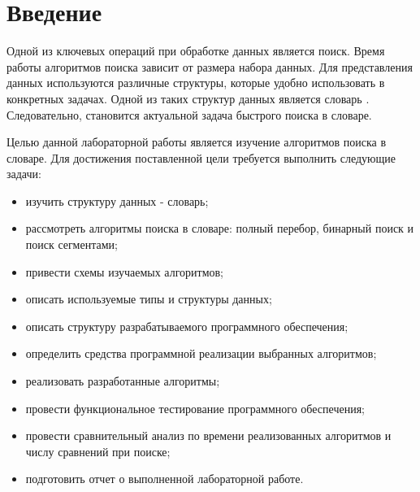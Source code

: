 \chapter*{Введение}

Одной из ключевых операций при обработке данных является поиск. Время работы алгоритмов поиска зависит от размера набора данных. Для представления данных используются различные структуры, которые удобно использовать в конкретных задачах. Одной из таких структур данных является словарь \cite{dict}. Следовательно, становится актуальной задача быстрого поиска в словаре.

Целью данной лабораторной работы является изучение алгоритмов поиска в словаре. Для достижения поставленной цели требуется выполнить следующие задачи:

\begin{itemize}
	\item изучить структуру данных - словарь;
	\item рассмотреть алгоритмы поиска в словаре: полный перебор, бинарный поиск и поиск сегментами;
	\item привести схемы изучаемых алгоритмов;
	\item описать используемые типы и структуры данных;
	\item описать структуру разрабатываемого программного обеспечения;
	\item определить средства программной реализации выбранных алгоритмов;
	\item реализовать разработанные алгоритмы;
	\item провести функциональное тестирование программного обеспечения;
	\item провести сравнительный анализ по времени реализованных алгоритмов и числу сравнений при поиске;
	\item подготовить отчет о выполненной лабораторной работе.
\end{itemize}